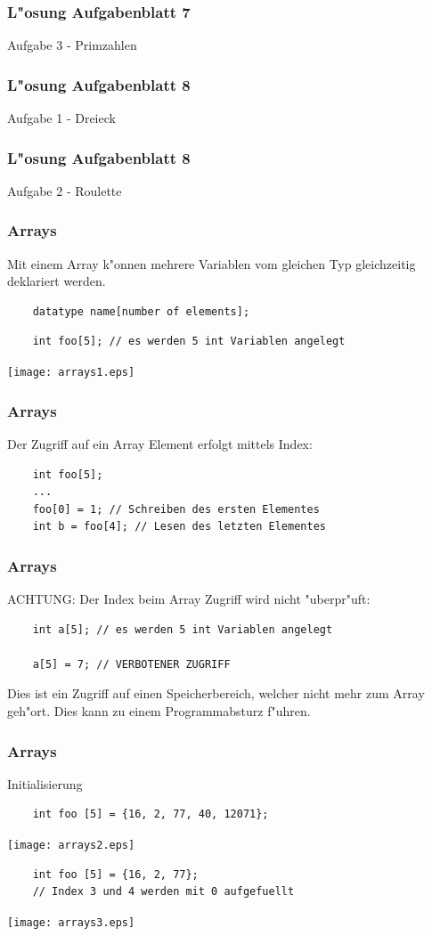 \documentclass{beamer}
\begin{document}
\begin{frame}[fragile]
	\frametitle{L"osung Aufgabenblatt 7}
	Aufgabe 3 - Primzahlen
	{\tiny
	
	}
\end{frame}

\begin{frame}[fragile]
	\frametitle{L"osung Aufgabenblatt 8}
	Aufgabe 1 - Dreieck
	{\tiny
	
	}
\end{frame}

\begin{frame}[fragile]
	\frametitle{L"osung Aufgabenblatt 8}
	Aufgabe 2 - Roulette
	{\tiny
	
	}
\end{frame}

\begin{frame}[fragile]
	\frametitle{Arrays}
        Mit einem Array k"onnen mehrere Variablen vom gleichen Typ
        gleichzeitig deklariert werden.
	\begin{lstlisting}
	datatype name[number of elements];
	\end{lstlisting}
	\begin{lstlisting}
	int foo[5]; // es werden 5 int Variablen angelegt
	\end{lstlisting}
	\texttt{[image: arrays1.eps]}
\end{frame}

\begin{frame}[fragile]
	\frametitle{Arrays}
        Der Zugriff auf ein Array Element erfolgt mittels Index:
	\begin{lstlisting}
	int foo[5];
	...
	foo[0] = 1; // Schreiben des ersten Elementes
	int b = foo[4]; // Lesen des letzten Elementes
	\end{lstlisting}
\end{frame}

\begin{frame}[fragile]
	\frametitle{Arrays}
        ACHTUNG: Der Index beim Array Zugriff wird nicht "uberpr"uft:
	\begin{lstlisting}
	int a[5]; // es werden 5 int Variablen angelegt

	a[5] = 7; // VERBOTENER ZUGRIFF
	\end{lstlisting}
	Dies ist ein Zugriff auf einen Speicherbereich, welcher nicht
	mehr zum Array geh"ort. Dies kann zu einem Programmabsturz f"uhren.
\end{frame}

\begin{frame}[fragile]
	\frametitle{Arrays}
        Initialisierung
	\begin{lstlisting}
	int foo [5] = {16, 2, 77, 40, 12071};
	\end{lstlisting}
	\texttt{[image: arrays2.eps]}
	\begin{lstlisting}
	int foo [5] = {16, 2, 77};
	// Index 3 und 4 werden mit 0 aufgefuellt
	\end{lstlisting}
	\texttt{[image: arrays3.eps]}
\end{frame}
\end{document}
